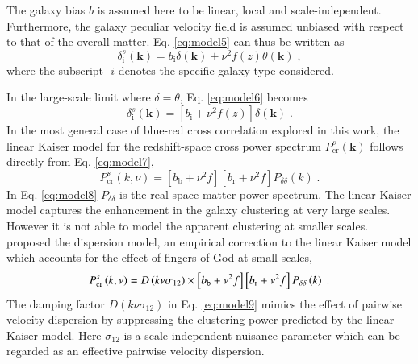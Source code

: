 \documentclass[longauth]{aa}
\def\({\left(}
\def\){\right)}
\def\[{\left[}
\def\]{\right]}
\begin{document}
The galaxy bias $b$ is assumed here to be linear, local and scale-independent. Furthermore, the galaxy peculiar velocity field is assumed unbiased with respect to that of the overall matter. Eq. \eqref{eq:model5} can thus be written as
	\begin{equation}
		\delta_{\mathrm{i}}^s\(\mathbf{k}\) = b_{\mathrm{i}}\delta\(\mathbf{k}\)+\nu^2f\(z\)\theta\(\mathbf{k}\)\; ,			\label{eq:model6}
	\end{equation}
where the subscript -$i$ denotes the specific galaxy type considered. 

In the large-scale limit where $\delta=\theta$, Eq. \eqref{eq:model6} becomes
	\begin{equation}
		\delta_{\mathrm{i}}^s\(\mathbf{k}\) = \[b_{\mathrm{i}}+\nu^2f\(z\)\]\delta\(\mathbf{k}\)\; .							\label{eq:model7}
	\end{equation}
In the most general case of blue-red cross correlation explored in this work, the linear Kaiser model \citep{kaiser87} for the redshift-space cross power spectrum $P^s_{\mathrm{cr}}\(\mathbf{k}\)$ follows directly from Eq. \eqref{eq:model7},
	\begin{equation}
		P^s_{\mathrm{cr}}\(k,\nu\)=\[b_{\mathrm{b}}+\nu^2f\]\[b_{\mathrm{r}}+\nu^2f\]P_{\delta\delta}\(k\)\; .			\label{eq:model8}
	\end{equation}
In Eq. \eqref{eq:model8} $P_{\delta\delta}$ is the real-space matter power spectrum. The linear Kaiser model captures the enhancement in the galaxy clustering at very large scales. However it is not able to model the apparent clustering at smaller scales. \citet{peacock94} proposed the dispersion model, an empirical correction to the linear Kaiser model which accounts for the effect of fingers of God at small scales,
	\begin{equation}
		P^s_{\rm{cr}}\(k,\nu\)=D\(k\nu\sigma_{12}\)\times\[b_{\mathrm{b}}+\nu^2f\]\[b_{\mathrm{r}}+\nu^2f\]P_{\delta\delta}\(k\)\; .	\label{eq:model9}
	\end{equation}
The damping factor $D\(k\nu\sigma_{12}\)$ in Eq. \eqref{eq:model9} mimics the effect of pairwise velocity dispersion by suppressing the clustering power predicted by the linear Kaiser model. Here $\sigma_{12}$ is a scale-independent nuisance parameter which can be regarded as an effective pairwise velocity dispersion.
\end{document}
